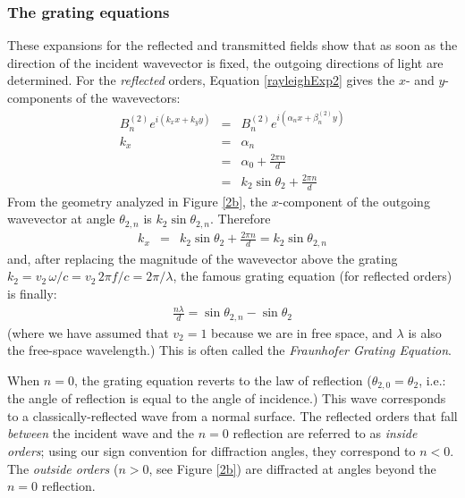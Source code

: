 \subsubsection{The grating equations}
These expansions for the reflected and transmitted fields show that as soon as the direction of the incident wavevector is fixed, the outgoing directions of light are determined.  For the \emph{reflected} orders, Equation \ref{rayleighExp2} gives the $x$- and $y$-components of the wavevectors:
\begin{eqnarray}
B^{(2)}_n e^{i(k_x x + k_y y)} &=& B^{(2)}_n e^{i(\alpha_n x + \beta^{(2)}_n y)} \\
k_x &=& \alpha_n \\
  &=& \alpha_0 + \frac{ 2\pi n}{d} \\
  &=& k_2 \sin \theta_2 +\frac{ 2\pi n}{d}
\end{eqnarray}
From the geometry analyzed in Figure \ref{2b}, the $x$-component of the outgoing wavevector at angle $\theta_{2,n}$ is $k_2 \sin \theta_{2,n}$.  Therefore
\begin{eqnarray}
\label{kxEqn2}
k_x &=& k_2 \sin \theta_2 +\frac{ 2\pi n}{d} = k_2 \sin \theta_{2,n}
\end{eqnarray}
and, after replacing the magnitude of the wavevector above the grating $k_2 = v_2\, \omega / c = v_2 \, 2\pi f / c =  2\pi / \lambda$, the famous grating equation (for reflected orders) is finally:
\begin{eqnarray}
\label{gratingEquation}
\frac{n \lambda}{d} = \sin \theta_{2,n} -  \sin \theta_{2}
\end{eqnarray}
(where we have assumed that $v_2 = 1$ because we are in free space, and $\lambda$ is also the free-space wavelength.) This is often called the \emph{Fraunhofer Grating Equation}.

When $n=0$, the grating equation reverts to the law of reflection ($\theta_{2,0} = \theta_2$, i.e.: the angle of reflection is equal to the angle of incidence.)  This wave corresponds to a classically-reflected wave from a normal surface.  The reflected orders that fall \emph{between} the incident wave and the $n=0$ reflection are referred to as \emph{inside orders}; using our sign convention for diffraction angles, they correspond to $n<0$.  The \emph{outside orders} ($n>0$, see Figure \ref{2b}) are diffracted at angles beyond the $n=0$ reflection.

